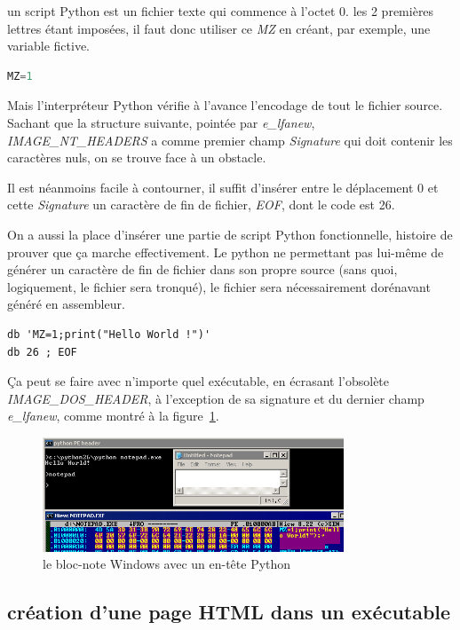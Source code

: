 un script Python est un fichier texte qui commence à l'octet 0. les 2 premières lettres étant imposées, il faut donc utiliser ce {\em MZ} en créant, par exemple, une variable fictive.
\begin{lstlisting}[language={Python},caption={un script python commençant par MZ},label={lst:albertini:pythonMZ}]
MZ=1
\end{lstlisting}

Mais l'interpréteur Python vérifie à l'avance l'encodage de tout le fichier source. Sachant que la structure suivante, pointée par {\em e\_lfanew}, {\em IMAGE\_NT\_HEADERS} a comme premier champ {\em Signature} qui doit contenir les caractères nuls, on se trouve face à un obstacle.

Il est néanmoins facile à contourner, il suffit d'insérer entre le déplacement 0 et cette {\em Signature} un caractère de fin de fichier, {\em EOF}, dont le code est 26.

On a aussi la place d'insérer une partie de script Python fonctionnelle, histoire de prouver que ça marche effectivement.
Le python ne permettant pas lui-même de générer un caractère de fin de fichier dans son propre source (sans quoi, logiquement, le fichier sera tronqué), le fichier sera nécessairement dorénavant généré en assembleur.
\begin{lstlisting}[language={},caption={un script python généré en assembleur},label={lst:albertini:pythonasm}]
db 'MZ=1;print("Hello World !")'
db 26 ; EOF
\end{lstlisting}

Ça peut se faire avec n'importe quel exécutable, en écrasant l'obsolète {\em IMAGE\_DOS\_HEADER}, à l'exception de sa signature et du dernier champ {\em e\_lfanew}, comme montré à la figure~\ref{fig:albertini:pythonnotepad}.
\begin{figure}[ht]
  \centering
  \includegraphics[width=0.8\textwidth]{albertini/img/pythonnotepad}
  \caption{le bloc-note Windows avec un en-tête Python}
  \label{fig:albertini:pythonnotepad}
\end{figure}

\subsection{création d'une page HTML dans un exécutable}

